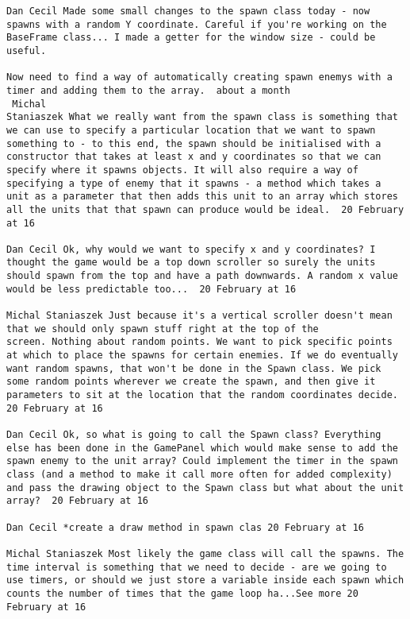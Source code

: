 \documentclass[10pt]{report}
\begin{document}
\begin{verbatim}
Dan Cecil Made some small changes to the spawn class today - now
spawns with a random Y coordinate. Careful if you're working on the
BaseFrame class... I made a getter for the window size - could be
useful.

Now need to find a way of automatically creating spawn enemys with a
timer and adding them to the array.  about a month 
 Michal
Staniaszek What we really want from the spawn class is something that
we can use to specify a particular location that we want to spawn
something to - to this end, the spawn should be initialised with a
constructor that takes at least x and y coordinates so that we can
specify where it spawns objects. It will also require a way of
specifying a type of enemy that it spawns - a method which takes a
unit as a parameter that then adds this unit to an array which stores
all the units that that spawn can produce would be ideal.  20 February
at 16

Dan Cecil Ok, why would we want to specify x and y coordinates? I
thought the game would be a top down scroller so surely the units
should spawn from the top and have a path downwards. A random x value
would be less predictable too...  20 February at 16

Michal Staniaszek Just because it's a vertical scroller doesn't mean
that we should only spawn stuff right at the top of the
screen. Nothing about random points. We want to pick specific points
at which to place the spawns for certain enemies. If we do eventually
want random spawns, that won't be done in the Spawn class. We pick
some random points wherever we create the spawn, and then give it
parameters to sit at the location that the random coordinates decide.
20 February at 16

Dan Cecil Ok, so what is going to call the Spawn class? Everything
else has been done in the GamePanel which would make sense to add the
spawn enemy to the unit array? Could implement the timer in the spawn
class (and a method to make it call more often for added complexity)
and pass the drawing object to the Spawn class but what about the unit
array?  20 February at 16

Dan Cecil ‎*create a draw method in spawn clas 20 February at 16

Michal Staniaszek Most likely the game class will call the spawns. The
time interval is something that we need to decide - are we going to
use timers, or should we just store a variable inside each spawn which
counts the number of times that the game loop ha...See more 20
February at 16


\end{verbatim}
\end{document}
